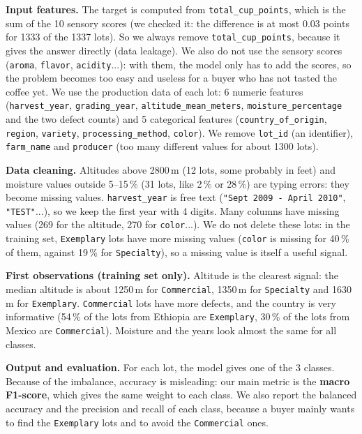\documentclass{article}
\begin{document}
\textbf{Input features.} The target is computed from \texttt{total\_cup\_points}, which is the sum of the 10 sensory scores (we checked it: the difference is at most 0.03 points for 1333 of the 1337 lots). So we always remove \texttt{total\_cup\_points}, because it gives the answer directly (data leakage). We also do not use the sensory scores (\texttt{aroma}, \texttt{flavor}, \texttt{acidity}...): with them, the model only has to add the scores, so the problem becomes too easy and useless for a buyer who has not tasted the coffee yet. We use the production data of each lot: 6 numeric features (\texttt{harvest\_year}, \texttt{grading\_year}, \texttt{altitude\_mean\_meters}, \texttt{moisture\_percentage} and the two defect counts) and 5 categorical features (\texttt{country\_of\_origin}, \texttt{region}, \texttt{variety}, \texttt{processing\_method}, \texttt{color}). We remove \texttt{lot\_id} (an identifier), \texttt{farm\_name} and \texttt{producer} (too many different values for about 1300 lots).

\textbf{Data cleaning.} Altitudes above 2800\,m (12 lots, some probably in feet) and moisture values outside 5--15\,\% (31 lots, like 2\,\% or 28\,\%) are typing errors: they become missing values. \texttt{harvest\_year} is free text (\texttt{"Sept 2009 - April 2010"}, \texttt{"TEST"}...), so we keep the first year with 4 digits. Many columns have missing values (269 for the altitude, 270 for \texttt{color}...). We do not delete these lots: in the training set, \texttt{Exemplary} lots have more missing values (\texttt{color} is missing for 40\,\% of them, against 19\,\% for \texttt{Specialty}), so a missing value is itself a useful signal.

\textbf{First observations (training set only).} Altitude is the clearest signal: the median altitude is about 1250\,m for \texttt{Commercial}, 1350\,m for \texttt{Specialty} and 1630\,m for \texttt{Exemplary}. \texttt{Commercial} lots have more defects, and the country is very informative (54\,\% of the lots from Ethiopia are \texttt{Exemplary}, 30\,\% of the lots from Mexico are \texttt{Commercial}). Moisture and the years look almost the same for all classes.

\textbf{Output and evaluation.} For each lot, the model gives one of the 3 classes. Because of the imbalance, accuracy is misleading: our main metric is the \textbf{macro F1-score}, which gives the same weight to each class. We also report the balanced accuracy and the precision and recall of each class, because a buyer mainly wants to find the \texttt{Exemplary} lots and to avoid the \texttt{Commercial} ones.
\end{document}
